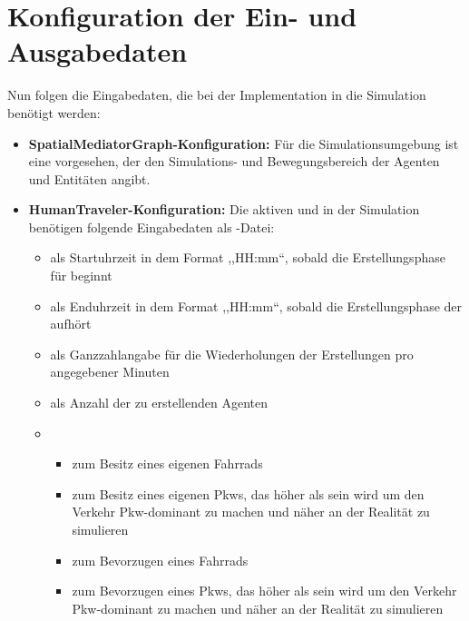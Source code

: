 %


\section{Konfiguration der Ein- und Ausgabedaten}\label{sec:input-output-configuration}

Nun folgen die Eingabedaten, die bei der Implementation in die Simulation benötigt werden:

\begin{itemize}
    \item \textbf{SpatialMediatorGraph-Konfiguration:} Für die Simulationsumgebung ist eine  vorgesehen, der den Simulations- und Bewegungsbereich der Agenten und Entitäten angibt.
    \item \textbf{HumanTraveler-Konfiguration:} Die aktiven  und  in der Simulation benötigen folgende Eingabedaten als -Datei:
    \begin{itemize}
        \item {} als Startuhrzeit in dem Format ,,HH:mm``, sobald die Erstellungsphase für  beginnt
        \item {} als Enduhrzeit in dem Format ,,HH:mm``, sobald die Erstellungsphase der  aufhört
        \item {} als Ganzzahlangabe für die Wiederholungen der Erstellungen pro angegebener Minuten
        \item {} als Anzahl der zu erstellenden Agenten
        \item {}
        \begin{itemize}
            \item {} zum Besitz eines eigenen Fahrrads
            \item {} zum Besitz eines eigenen Pkws, das höher als  sein wird um den Verkehr Pkw-dominant zu machen und näher an der Realität zu simulieren
            \item {} zum Bevorzugen eines Fahrrads
            \item {} zum Bevorzugen eines Pkws, das höher als  sein wird um den Verkehr Pkw-dominant zu machen und näher an der Realität zu simulieren

\end{itemize}
\end{itemize}
\end{itemize}

